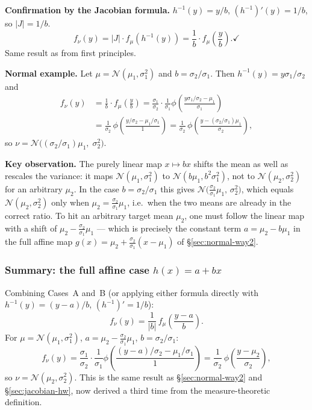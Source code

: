 \documentclass[11pt,a4paper]{article}
\newcommand{\N}{\mathcal{N}}
\begin{document}
\medskip\noindent\textbf{Confirmation by the Jacobian formula.}
$h^{-1}(y)=y/b$, $(h^{-1})'(y)=1/b$, so $|J|=1/b$.
\[
  f_\nu(y)=|J|\cdot f_\mu(h^{-1}(y))=\frac{1}{b}\cdot f_\mu\!\left(\frac{y}{b}\right). \checkmark
\]
Same result as from first principles.

\medskip\noindent\textbf{Normal example.}
Let $\mu=\N(\mu_1,\sigma_1^2)$ and $b=\sigma_2/\sigma_1$.  Then $h^{-1}(y)=y\sigma_1/\sigma_2$ and
\begin{align*}
  f_\nu(y)
  &= \frac{1}{b}\cdot f_\mu\!\left(\frac{y}{b}\right)
   = \frac{\sigma_1}{\sigma_2}\cdot\frac{1}{\sigma_1}
     \phi\!\left(\frac{y\sigma_1/\sigma_2-\mu_1}{\sigma_1}\right) \\[4pt]
  &= \frac{1}{\sigma_2}\,\phi\!\left(\frac{y/\sigma_2 - \mu_1/\sigma_1}{1}\right)
   = \frac{1}{\sigma_2}\,\phi\!\left(\frac{y-(\sigma_2/\sigma_1)\mu_1}{\sigma_2}\right),
\end{align*}
so $\nu = \N\!\bigl((\sigma_2/\sigma_1)\mu_1,\;\sigma_2^2\bigr)$.

\medskip\noindent\textbf{Key observation.}
The purely linear map $x\mapsto bx$ shifts the mean as well as rescales the variance:
it maps $\N(\mu_1,\sigma_1^2)$ to $\N(b\mu_1,b^2\sigma_1^2)$, not to $\N(\mu_2,\sigma_2^2)$
for an arbitrary $\mu_2$.  In the case $b=\sigma_2/\sigma_1$ this gives
$\N\bigl(\frac{\sigma_2}{\sigma_1}\mu_1,\,\sigma_2^2\bigr)$, which equals $\N(\mu_2,\sigma_2^2)$
only when $\mu_2=\frac{\sigma_2}{\sigma_1}\mu_1$, i.e.\ when the two means are already in the
correct ratio.
To hit an arbitrary target mean $\mu_2$, one must follow the linear map with a shift of
$\mu_2-\frac{\sigma_2}{\sigma_1}\mu_1$ --- which is precisely the constant term $a=\mu_2-b\mu_1$
in the full affine map $g(x)=\mu_2+\frac{\sigma_2}{\sigma_1}(x-\mu_1)$ of \S\ref{sec:normal-way2}.

\subsubsection*{Summary: the full affine case $h(x)=a+bx$}

Combining Cases~A and~B (or applying either formula directly with $h^{-1}(y)=(y-a)/b$,
$(h^{-1})'=1/b$):
\[
  f_\nu(y)
  = \frac{1}{|b|}\,f_\mu\!\left(\frac{y-a}{b}\right).
\]
For $\mu=\N(\mu_1,\sigma_1^2)$, $a=\mu_2-\frac{\sigma_2}{\sigma_1}\mu_1$, $b=\sigma_2/\sigma_1$:
\[
  f_\nu(y)
  = \frac{\sigma_1}{\sigma_2}\cdot\frac{1}{\sigma_1}
    \phi\!\left(\frac{(y-a)/\sigma_2-\mu_1/\sigma_1}{1}\right)
  = \frac{1}{\sigma_2}\,\phi\!\left(\frac{y-\mu_2}{\sigma_2}\right),
\]
so $\nu=\N(\mu_2,\sigma_2^2)$. \checkmark\quad
This is the same result as \S\ref{sec:normal-way2} and \S\ref{sec:jacobian-hw}, now
derived a third time from the measure-theoretic definition.
\end{document}
